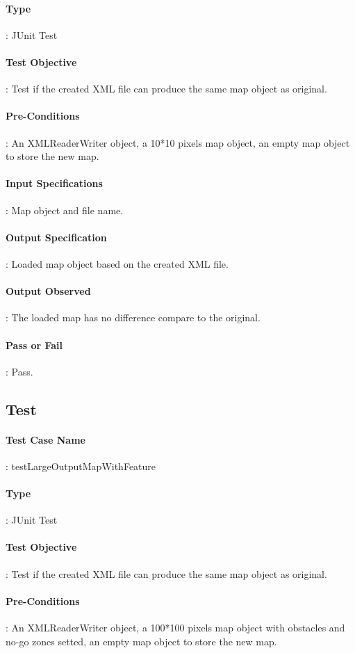 \documentclass[12pt, a4paper]{report}
\begin{document}
\paragraph{Type}: JUnit Test
\paragraph{Test Objective}: Test if the created XML file can produce the same map object as original. 
\paragraph{Pre-Conditions}: An XMLReaderWriter object, a 10*10 pixels map object, an empty map object to store the new map. 
\paragraph{Input Specifications}: Map object and file name.
\paragraph{Output Specification}: Loaded map object based on the created XML file.
\paragraph{Output Observed}: The loaded map has no difference compare to the original.
\paragraph{Pass or Fail}: Pass.
\pagebreak

\addtocounter{casecounter}{1}
\subsection{Test }
\paragraph{Test Case Name}: testLargeOutputMapWithFeature
\paragraph{Type}: JUnit Test
\paragraph{Test Objective}: Test if the created XML file can produce the same map object as original. 
\paragraph{Pre-Conditions}: An XMLReaderWriter object, a 100*100 pixels map object with obstacles and no-go zones setted, an empty map object to store the new map. 
\end{document}
